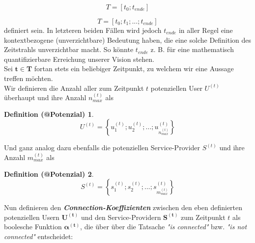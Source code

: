 \documentclass[11pt]{scrartcl}
\makeatletter
\newtheorem{def_potenzial}{Definition (@Potenzial)}
\makeatother
\begin{document}
\begin{equation*}
  T = [t_0; t_{ende}]
\end{equation*}

\begin{equation*}
  T = [t_0; t_1;...; t_{ende}]
\end{equation*}
definiert sein. In letzteren beiden Fällen wird jedoch $t_{ende}$ in aller Regel eine kontextbezogene (unverzichtbare) Bedeutung haben, die eine solche Definition des Zeitstrahls unverzichtbar macht. So könnte $t_{ende}$ z. B. für eine mathematisch quantifizierbare Erreichung unserer Vision stehen. \\

Sei $\mathbf{t \in T}$ fortan stets ein beliebiger Zeitpunkt, zu welchem wir eine Aussage treffen möchten. \\


Wir definieren die Anzahl aller zum Zeitpunkt $t$ potenziellen User $U^{(t)}$ überhaupt und ihre Anzahl $n^{(t)}_{max}$ als \\

\begin{def_potenzial}
\begin{equation*}
  U^{(t)} = \left\{ u^{(t)}_1; u^{(t)}_2;...; u^{(t)}_{n^{(t)}_{max}} \right\}
\end{equation*}
\end{def_potenzial} 

\vspace{0.3cm}


Und ganz analog dazu ebenfalls die potenziellen Service-Provider $S^{(t)}$ und ihre Anzahl $m^{(t)}_{max}$ als \\

\begin{def_potenzial}
\begin{equation*}
  S^{(t)} = \left\{ s^{(t)}_1; s^{(t)}_2;...; s^{(t)}_{m^{(t)}_{max}}\right\}
\end{equation*}
\end{def_potenzial}

\vspace{1cm}


Nun definieren den \textbf{\textit{Connection-Koeffizienten}} zwischen den eben definierten potenziellen Usern $\mathbf{U^{(t)}}$ und den Service-Providern $\mathbf{S^{(t)}}$ zum Zeitpunkt $t$ als boolesche Funktion $\mathbf{\alpha^{(t)}}$, die über über die Tatsache \textit{"is connected"} bzw. \textit{"is not connected"} entscheidet: \\
\end{document}
